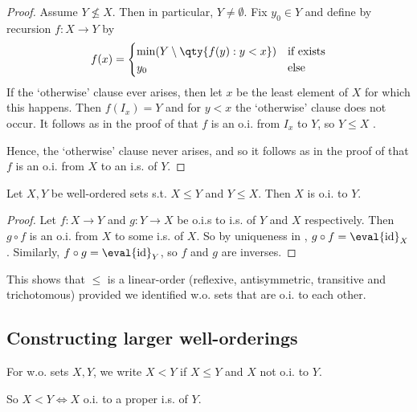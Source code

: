 \begin{proof}
    Assume $Y \nleq X$.
    Then in particular, $Y \neq \emptyset$.
    Fix $y_0 \in Y$ and define by recursion $f \colon X \to Y$ by
    \begin{align*}
        f(x) = \begin{cases}
            \min (Y \setminus \qty{f(y) : y < x}) & \text{if exists} \\
            y_0 & \text{else}
        \end{cases}
    \end{align*}
    If the `otherwise' clause ever arises, then let $x$ be the least element of $X$ for which this happens.
    Then $f(I_x) = Y$ and for $y < x$ the `otherwise' clause does not occur.
    It follows as in the proof of  that $f$ is an o.i. from $I_x$ to $Y$, so $Y \leq X$ \Lightning.

    Hence, the `otherwise' clause never arises, and so it follows as in the proof of  that $f$ is an o.i. from $X$ to an i.s. of $Y$.
\end{proof}

\begin{proposition}
    Let $X, Y$ be well-ordered sets s.t. $X \leq Y$ and $Y \leq X$.
    Then $X$ is o.i. to $Y$.
\end{proposition}

\begin{proof}
    Let $f \colon X \to Y$ and $g \colon Y \to X$ be o.i.s to i.s. of $Y$ and $X$ respectively.
    Then $g \circ f$ is an o.i. from $X$ to some i.s. of $X$.
    So by uniqueness in , $g \circ f = \eval{\operatorname{id}}_X$.
    Similarly, $f \circ g = \eval{\operatorname{id}}_Y$, so $f$ and $g$ are inverses.
\end{proof}

\begin{remark}
    This shows that $\leq$ is a linear-order (reflexive, antisymmetric, transitive and trichotomous) provided we identified w.o. sets that are o.i. to each other. \\
\end{remark}

\subsection{Constructing larger well-orderings}

\begin{definition}
    For w.o. sets $X, Y$, we write $X < Y$ if $X \leq Y$ and $X$ not o.i. to $Y$.
\end{definition}
So $X < Y \iff X$ o.i. to a proper i.s. of $Y$.

